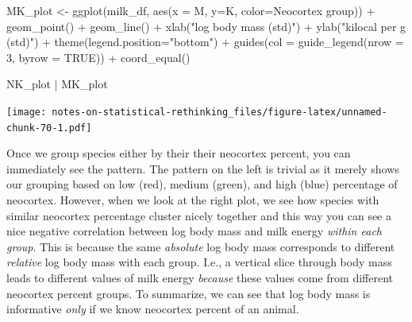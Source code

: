\documentclass[
]{book}
\newenvironment{Shaded}{\begin{snugshade}}{\end{snugshade}}
\newcommand{\AttributeTok}[1]{\textcolor[rgb]{0.77,0.63,0.00}{#1}}
\newcommand{\ConstantTok}[1]{\textcolor[rgb]{0.00,0.00,0.00}{#1}}
\newcommand{\DecValTok}[1]{\textcolor[rgb]{0.00,0.00,0.81}{#1}}
\newcommand{\FunctionTok}[1]{\textcolor[rgb]{0.00,0.00,0.00}{#1}}
\newcommand{\NormalTok}[1]{#1}
\newcommand{\OtherTok}[1]{\textcolor[rgb]{0.56,0.35,0.01}{#1}}
\newcommand{\SpecialCharTok}[1]{\textcolor[rgb]{0.00,0.00,0.00}{#1}}
\newcommand{\StringTok}[1]{\textcolor[rgb]{0.31,0.60,0.02}{#1}}
\begin{document}
\begin{Shaded}
\begin{Highlighting}[]
\NormalTok{MK\_plot }\OtherTok{\textless{}{-}} 
  \FunctionTok{ggplot}\NormalTok{(milk\_df, }\FunctionTok{aes}\NormalTok{(}\AttributeTok{x =}\NormalTok{ M, }\AttributeTok{y=}\NormalTok{K, }\AttributeTok{color=}\StringTok{\textasciigrave{}}\AttributeTok{Neocortex group}\StringTok{\textasciigrave{}}\NormalTok{)) }\SpecialCharTok{+} 
  \FunctionTok{geom\_point}\NormalTok{() }\SpecialCharTok{+} 
  \FunctionTok{geom\_line}\NormalTok{() }\SpecialCharTok{+}
  \FunctionTok{xlab}\NormalTok{(}\StringTok{"log body mass (std)"}\NormalTok{) }\SpecialCharTok{+} 
  \FunctionTok{ylab}\NormalTok{(}\StringTok{"kilocal per g (std)"}\NormalTok{) }\SpecialCharTok{+} 
  \FunctionTok{theme}\NormalTok{(}\AttributeTok{legend.position=}\StringTok{"bottom"}\NormalTok{) }\SpecialCharTok{+}
  \FunctionTok{guides}\NormalTok{(}\AttributeTok{col =} \FunctionTok{guide\_legend}\NormalTok{(}\AttributeTok{nrow =} \DecValTok{3}\NormalTok{, }\AttributeTok{byrow =} \ConstantTok{TRUE}\NormalTok{)) }\SpecialCharTok{+}
  \FunctionTok{coord\_equal}\NormalTok{()}

\NormalTok{NK\_plot }\SpecialCharTok{|}\NormalTok{ MK\_plot}
\end{Highlighting}
\end{Shaded}

\texttt{[image: notes-on-statistical-rethinking\_files/figure-latex/unnamed-chunk-70-1.pdf]}

Once we group species either by their their neocortex percent, you can immediately see the pattern. The pattern on the left is trivial as it merely shows our grouping based on low (red), medium (green), and high (blue) percentage of neocortex. However, when we look at the right plot, we see how species with similar neocortex percentage cluster nicely together and this way you can see a nice negative correlation between log body mass and milk energy \emph{within each group}. This is because the same \emph{absolute} log body mass corresponds to different \emph{relative} log body mass with each group. I.e., a vertical slice through body mass leads to different values of milk energy \emph{because} these values come from different neocortex percent groups. To summarize, we can see that log body mass is informative \emph{only} if we know neocortex percent of an animal.
\end{document}
